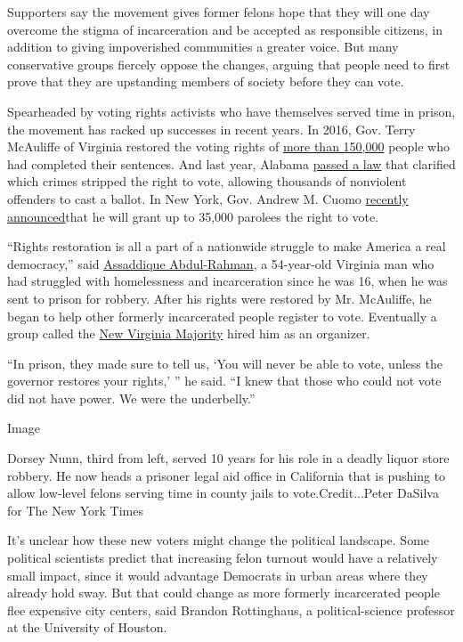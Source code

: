 Supporters say the movement gives former felons hope that they will one
day overcome the stigma of incarceration and be accepted as responsible
citizens, in addition to giving impoverished communities a greater
voice. But many conservative groups fiercely oppose the changes, arguing
that people need to first prove that they are upstanding members of
society before they can vote.

Spearheaded by voting rights activists who have themselves served time
in prison, the movement has racked up successes in recent years. In
2016, Gov. Terry McAuliffe of Virginia restored the voting rights of
\href{https://www.brennancenter.org/analysis/voting-rights-restoration-efforts-virginia}{more
than 150,000} people who had completed their sentences. And last year,
Alabama
\href{https://www.aclualabama.org/en/crimes-moral-turpitude}{passed a
law} that clarified which crimes stripped the right to vote, allowing
thousands of nonviolent offenders to cast a ballot. In New York, Gov.
Andrew M. Cuomo
\href{https://www.nytimes3xbfgragh.onion/2018/04/18/nyregion/felons-pardon-voting-rights-cuomo.html}{recently
announced}that he will grant up to 35,000 parolees the right to vote.

``Rights restoration is all a part of a nationwide struggle to make
America a real democracy,'' said
\href{https://www.motherjones.com/politics/2017/11/ex-felons-voting-for-the-first-time-could-shake-virginias-governors-race/}{Assaddique
Abdul-Rahman}, a 54-year-old Virginia man who had struggled with
homelessness and incarceration since he was 16, when he was sent to
prison for robbery. After his rights were restored by Mr. McAuliffe, he
began to help other formerly incarcerated people register to vote.
Eventually a group called the
\href{https://populardemocracy.org/our-partners/new-virginia-majority}{New
Virginia Majority} hired him as an organizer.

``In prison, they made sure to tell us, `You will never be able to vote,
unless the governor restores your rights,' '' he said. ``I knew that
those who could not vote did not have power. We were the underbelly.''

Image

Dorsey Nunn, third from left, served 10 years for his role in a deadly
liquor store robbery. He now heads a prisoner legal aid office in
California that is pushing to allow low-level felons serving time in
county jails to vote.Credit...Peter DaSilva for The New York Times

It's unclear how these new voters might change the political landscape.
Some political scientists predict that increasing felon turnout would
have a relatively small impact, since it would advantage Democrats in
urban areas where they already hold sway. But that could change as more
formerly incarcerated people flee expensive city centers, said Brandon
Rottinghaus, a political-science professor at the University of Houston.

